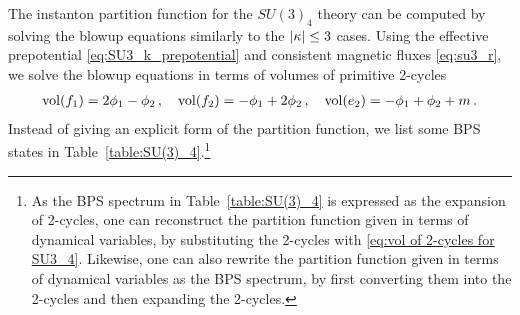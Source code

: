 The instanton partition function for the $SU(3)_4$ theory can be computed by solving the blowup equations similarly to the $ \abs{\kappa} \leq 3 $ cases. Using the effective prepotential \eqref{eq:SU3_k_prepotential} and consistent magnetic fluxes \eqref{eq:su3_r}, we solve the blowup equations in terms of volumes of primitive 2-cycles
\begin{align}\label{eq:vol of 2-cycles for SU3_4}
\operatorname{vol}(f_1) = 2\phi_1 - \phi_2 \, , \quad
\operatorname{vol}(f_2) = -\phi_1 + 2\phi_2 \, , \quad
\operatorname{vol}(e_2) = -\phi_1 + \phi_2 + m \, .
\end{align}
Instead of giving an explicit form of the partition function, we list some BPS states in Table~\ref{table:SU(3)_4}.\footnote{As the BPS spectrum in Table~\ref{table:SU(3)_4} is expressed as the expansion of 2-cycles, one can reconstruct the partition function given in terms of dynamical variables, by substituting the 2-cycles with \eqref{eq:vol of 2-cycles for SU3_4}. Likewise, one can also rewrite the partition function given in terms of dynamical variables as the BPS spectrum, by first converting them into the 2-cycles and then expanding the 2-cycles.}
